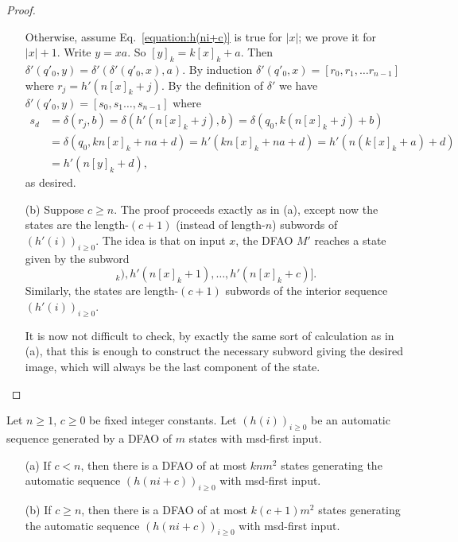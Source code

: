 \documentclass[12pt,reqno]{article}
\begin{document}
\begin{proof}
\begin{itemize}
Otherwise, assume Eq.~\eqref{equation:h(ni+c)} is true for $|x|$; we prove it for $|x|+1$.  Write
$y = xa$.  So $[y]_k = k[x]_k + a$.  Then
$\delta'( q'_0, y) =
\delta'(\delta'(q'_0, x),a)$.
By induction
$\delta'( q'_0, x) =  [r_0, r_1,\ldots r_{n-1}]$ where $r_j = h'(n[x]_k + j)$.  By the definition of $\delta'$ we have
$\delta'(q'_0, y) = 
[s_0, s_1 \ldots, s_{n-1}]$ where
\begin{align*}
    s_d &= \delta(r_j, b) = \delta(h'(n[x]_k +j), b) 
    =\delta(q_0, k(n[x]_k+j)+b)\\
&= \delta(q_0, kn[x]_k + na+d)
= h'(kn[x]_k + na+d)
= h'(n(k[x]_k+a) + d)\\
&= h'(n [y]_k + d),
\end{align*}
as desired.

\item[(b)]  Suppose $c \geq n$.  The proof proceeds exactly as in (a), except now the states are the length-$(c+1)$ (instead of length-$n$) subwords of
$(h'(i))_{i \geq 0}$. The idea is that on input $x$, the DFAO $M'$
    reaches a state given by the
    subword 
    \begin{equation}
        [h'(n[x]_k), h'(n[x]_k+1), \ldots, h'(n[x]_k+c)].
    \end{equation}
Similarly, the states are length-$(c+1)$ subwords of the interior sequence $(h'(i))_{i \geq 0}$.

It is now not difficult to check, by exactly the same sort of calculation as in (a), that this is enough to construct the necessary subword giving the desired image, which will always be the last component of the state.
\end{itemize}
\end{proof}

\begin{corollary} \label{corollary:h(ni+c)-msd-sc}
Let $n \geq 1$, $c \geq 0$ be fixed integer constants.
Let $(h(i))_{i \geq 0}$ be an automatic sequence generated by a DFAO of $m$ states with msd-first input.   
\begin{itemize}
    \item[(a)] If $c < n$, then there is a DFAO of at most $k n m^2$ states
    generating the automatic sequence $(h(ni+c))_{i \geq 0}$ with msd-first input.
    \item[(b)] If $c \geq n$, then there is a DFAO of at most $k (c+1) m^2$ states generating the automatic sequence $(h(ni+c))_{i \geq 0}$ with msd-first input.
\end{itemize}
\end{corollary}
\end{document}
